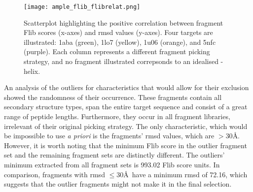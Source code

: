 \begin{figure}[H]
	\centering
	\texttt{[image: ample\_flib\_flibrelat.png]}
	\caption[Correlation analysis for Flib score and \gls{rmsd}]{Scatterplot highlighting the positive correlation between fragment Flib scores (x-axes) and \gls{rmsd} values (y-axes). Four targets are illustrated: 1aba (green), 1lo7 (yellow), 1u06 (orange), and 5nfc (purple). Each column represents a different fragment picking strategy, and no fragment illustrated correpsonds to an idealised \textalpha-helix.}
	\label{fig:ample_flib_flibrelat}
\end{figure}

An analysis of the outliers for characteristics that would allow for their exclusion showed the randomness of their occurrence. These fragments contain all secondary structure types, span the entire target sequence and consist of a great range of peptide lengths. Furthermore, they occur in all fragment libraries, irrelevant of their original picking strategy. The only characteristic, which would be impossible to use \textit{a priori} is the fragments' \gls{rmsd} values, which are $>30$\AA. However, it is worth noting that the minimum Flib score in the outlier fragment set and the remaining fragment sets are distinctly different. The outliers' minimum extracted from all fragment sets is 993.02 Flib score units. In comparison, fragments with \gls{rmsd} $\leq30$\AA\ have a minimum \gls{rmsd} of 72.16, which suggests that the outlier fragments might not make it in the final selection.
